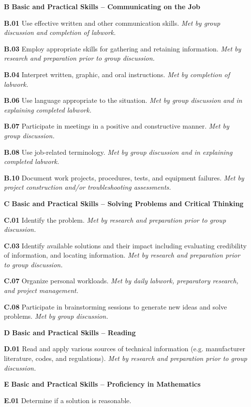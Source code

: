 \medskip
\item{\bf B} {\bf Basic and Practical Skills -- Communicating on the Job}
\item{\bf B.01} Use effective written and other communication skills.  {\it Met by group discussion and completion of labwork.}
\item{\bf B.03} Employ appropriate skills for gathering and retaining information.  {\it Met by research and preparation prior to group discussion.}
\item{\bf B.04} Interpret written, graphic, and oral instructions.  {\it Met by completion of labwork.}
\item{\bf B.06} Use language appropriate to the situation.  {\it Met by group discussion and in explaining completed labwork.}
\item{\bf B.07} Participate in meetings in a positive and constructive manner.  {\it Met by group discussion.}
\item{\bf B.08} Use job-related terminology.  {\it Met by group discussion and in explaining completed labwork.}
\item{\bf B.10} Document work projects, procedures, tests, and equipment failures.  {\it Met by project construction and/or troubleshooting assessments.}
\item{\bf C} {\bf Basic and Practical Skills -- Solving Problems and Critical Thinking}
\item{\bf C.01} Identify the problem.  {\it Met by research and preparation prior to group discussion.}
\item{\bf C.03} Identify available solutions and their impact including evaluating credibility of information, and locating information.  {\it Met by research and preparation prior to group discussion.}
\item{\bf C.07} Organize personal workloads.  {\it Met by daily labwork, preparatory research, and project management.}
\item{\bf C.08} Participate in brainstorming sessions to generate new ideas and solve problems.  {\it Met by group discussion.}
\item{\bf D} {\bf Basic and Practical Skills -- Reading}
\item{\bf D.01} Read and apply various sources of technical information (e.g. manufacturer literature, codes, and regulations).  {\it Met by research and preparation prior to group discussion.}
\item{\bf E} {\bf Basic and Practical Skills -- Proficiency in Mathematics}
\item{\bf E.01} Determine if a solution is reasonable.
